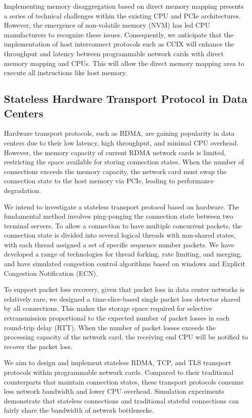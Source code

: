 Implementing memory disaggregation based on direct memory mapping presents a series of technical challenges within the existing CPU and PCIe architectures. However, the emergence of non-volatile memory (NVM) has led CPU manufacturers to recognize these issues. Consequently, we anticipate that the implementation of host interconnect protocols such as CCIX will enhance the throughput and latency between programmable network cards with direct memory mapping and CPUs. This will allow the direct memory mapping area to execute all instructions like host memory.

\subsection{Stateless Hardware Transport Protocol in Data Centers}

Hardware transport protocols, such as RDMA, are gaining popularity in data centers due to their low latency, high throughput, and minimal CPU overhead. However, the memory capacity of current RDMA network cards is limited, restricting the space available for storing connection states. When the number of connections exceeds the memory capacity, the network card must swap the connection state to the host memory via PCIe, leading to performance degradation.

We intend to investigate a stateless transport protocol based on hardware. The fundamental method involves ping-ponging the connection state between two terminal servers. To allow a connection to have multiple concurrent packets, the connection state is divided into several logical threads with non-shared states, with each thread assigned a set of specific sequence number packets. We have developed a range of technologies for thread forking, rate limiting, and merging, and have simulated congestion control algorithms based on windows and Explicit Congestion Notification (ECN). 

To support packet loss recovery, given that packet loss in data center networks is relatively rare, we designed a time-slice-based single packet loss detector shared by all connections. This makes the storage space required for selective retransmission proportional to the expected number of packet losses in each round-trip delay (RTT). When the number of packet losses exceeds the processing capacity of the network card, the receiving end CPU will be notified to recover the packet loss.

We aim to design and implement stateless RDMA, TCP, and TLS transport protocols within programmable network cards. Compared to their traditional counterparts that maintain connection states, these transport protocols consume less network bandwidth and lower CPU overhead. Simulation experiments demonstrate that stateless connections and traditional stateful connections can fairly share the bandwidth of network bottlenecks.

